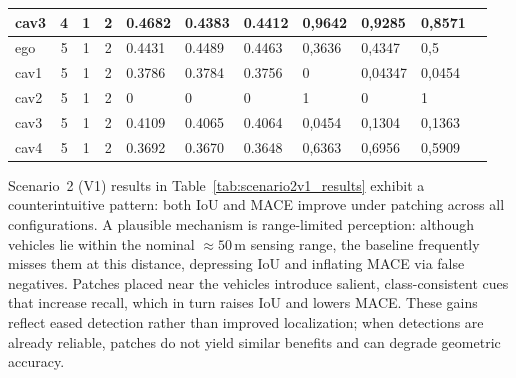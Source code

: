 \begin{table}[tph]
\begin{tabularx}{\textwidth}{l c c c *{7}{X}}
        cav3             & 4           & 1                                     & 2                                & 0.4682                            & 0.4383 & 0.4412 & 0,9642 & 0,9285  & 0,8571 \\
        \midrule
        ego              & 5           & 1                                     & 2                                & 0.4431                            & 0.4489 & 0.4463 & 0,3636 & 0,4347  & 0,5    \\
        cav1             & 5           & 1                                     & 2                                & 0.3786                            & 0.3784 & 0.3756 & 0      & 0,04347 & 0,0454 \\
        cav2             & 5           & 1                                     & 2                                & 0                                 & 0      & 0      & 1      & 0       & 1      \\
        cav3             & 5           & 1                                     & 2                                & 0.4109                            & 0.4065 & 0.4064 & 0,0454 & 0,1304  & 0,1363 \\
        cav4             & 5           & 1                                     & 2                                & 0.3692                            & 0.3670 & 0.3648 & 0,6363 & 0,6956  & 0,5909 \\
        \bottomrule
    \end{tabularx}
\end{table}
Scenario~2 (V1) results in Table~\ref{tab:scenario2v1_results} exhibit a counterintuitive pattern: both IoU and MACE improve under patching across all configurations.
A plausible mechanism is range-limited perception: although vehicles lie within the nominal \(\approx 50\,\mathrm{m}\) sensing range, the baseline frequently misses them at this distance, depressing IoU and inflating MACE via false negatives.
Patches placed near the vehicles introduce salient, class-consistent cues that increase recall, which in turn raises IoU and lowers MACE.
These gains reflect eased detection rather than improved localization; when detections are already reliable, patches do not yield similar benefits and can degrade geometric accuracy.

